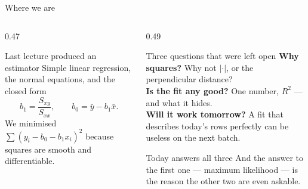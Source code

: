 \documentclass[aspectratio=169]{beamer}
\begin{document}
\begin{frame}[shrink=5]{Where we are}
  \begin{columns}[T]
    \begin{column}{0.47\textwidth}
      \begin{block}{Last lecture produced an estimator}
        Simple linear regression, the normal equations, and the closed form
        \[ b_1 = \frac{S_{xy}}{S_{xx}}, \qquad b_0 = \bar y - b_1 \bar x . \]
        We minimised $\sum (y_i - b_0 - b_1 x_i)^2$ because squares are
        smooth and differentiable.
      \end{block}
    \end{column}
    \begin{column}{0.49\textwidth}
      \begin{exampleblock}{Three questions that were left open}
        \textbf{Why squares?} Why not $|{\cdot}|$, or the perpendicular
        distance? \\[0.3em]
        \textbf{Is the fit any good?} One number, $R^2$ --- and what it
        hides. \\[0.3em]
        \textbf{Will it work tomorrow?} A fit that describes today's rows
        perfectly can be useless on the next batch.
      \end{exampleblock}
      \begin{alertblock}{Today answers all three}
        \small And the answer to the first one --- maximum likelihood ---
        is the reason the other two are even askable.
      \end{alertblock}
    \end{column}
  \end{columns}
\end{frame}
\end{document}

